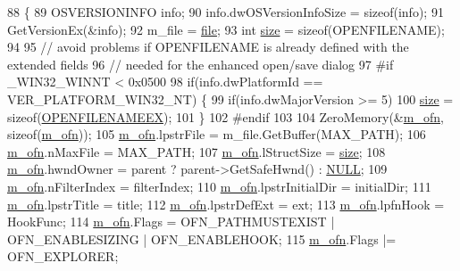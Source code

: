 \begin{DoxyCode}
88 \{
89   OSVERSIONINFO info;
90   info.dwOSVersionInfoSize = \textcolor{keyword}{sizeof}(info);
91   GetVersionEx(&info);
92   m\_file = \mbox{\hyperlink{expr-lex_8cpp_a702945180aa732857b380a007a7e2a21}{file}};
93   \textcolor{keywordtype}{int} \mbox{\hyperlink{expr-lex_8cpp_ab7d671599a7b25ca99a487fa341bc33a}{size}} = \textcolor{keyword}{sizeof}(OPENFILENAME);
94   
95   \textcolor{comment}{// avoid problems if OPENFILENAME is already defined with the extended fields}
96   \textcolor{comment}{// needed for the enhanced open/save dialog}
97 \textcolor{preprocessor}{#if \_WIN32\_WINNT < 0x0500}
98   \textcolor{keywordflow}{if}(info.dwPlatformId == VER\_PLATFORM\_WIN32\_NT) \{
99     \textcolor{keywordflow}{if}(info.dwMajorVersion >= 5)
100       \mbox{\hyperlink{expr-lex_8cpp_ab7d671599a7b25ca99a487fa341bc33a}{size}} = \textcolor{keyword}{sizeof}(\mbox{\hyperlink{struct_o_p_e_n_f_i_l_e_n_a_m_e_e_x}{OPENFILENAMEEX}});
101   \}
102 \textcolor{preprocessor}{#endif}
103 
104   ZeroMemory(&\mbox{\hyperlink{class_file_dlg_a3ee514d5dca456bd90c598af5412269a}{m\_ofn}}, \textcolor{keyword}{sizeof}(\mbox{\hyperlink{class_file_dlg_a3ee514d5dca456bd90c598af5412269a}{m\_ofn}}));
105   \mbox{\hyperlink{class_file_dlg_a3ee514d5dca456bd90c598af5412269a}{m\_ofn}}.lpstrFile = m\_file.GetBuffer(MAX\_PATH);
106   \mbox{\hyperlink{class_file_dlg_a3ee514d5dca456bd90c598af5412269a}{m\_ofn}}.nMaxFile = MAX\_PATH;
107   \mbox{\hyperlink{class_file_dlg_a3ee514d5dca456bd90c598af5412269a}{m\_ofn}}.lStructSize = \mbox{\hyperlink{expr-lex_8cpp_ab7d671599a7b25ca99a487fa341bc33a}{size}};
108   \mbox{\hyperlink{class_file_dlg_a3ee514d5dca456bd90c598af5412269a}{m\_ofn}}.hwndOwner = parent ? parent->GetSafeHwnd() : \mbox{\hyperlink{getopt1_8c_a070d2ce7b6bb7e5c05602aa8c308d0c4}{NULL}};
109   \mbox{\hyperlink{class_file_dlg_a3ee514d5dca456bd90c598af5412269a}{m\_ofn}}.nFilterIndex = filterIndex;
110   \mbox{\hyperlink{class_file_dlg_a3ee514d5dca456bd90c598af5412269a}{m\_ofn}}.lpstrInitialDir = initialDir;
111   \mbox{\hyperlink{class_file_dlg_a3ee514d5dca456bd90c598af5412269a}{m\_ofn}}.lpstrTitle = title;
112   \mbox{\hyperlink{class_file_dlg_a3ee514d5dca456bd90c598af5412269a}{m\_ofn}}.lpstrDefExt = ext;
113   \mbox{\hyperlink{class_file_dlg_a3ee514d5dca456bd90c598af5412269a}{m\_ofn}}.lpfnHook = HookFunc;
114   \mbox{\hyperlink{class_file_dlg_a3ee514d5dca456bd90c598af5412269a}{m\_ofn}}.Flags = OFN\_PATHMUSTEXIST | OFN\_ENABLESIZING | OFN\_ENABLEHOOK;
115   \mbox{\hyperlink{class_file_dlg_a3ee514d5dca456bd90c598af5412269a}{m\_ofn}}.Flags |= OFN\_EXPLORER;

\end{DoxyCode}
